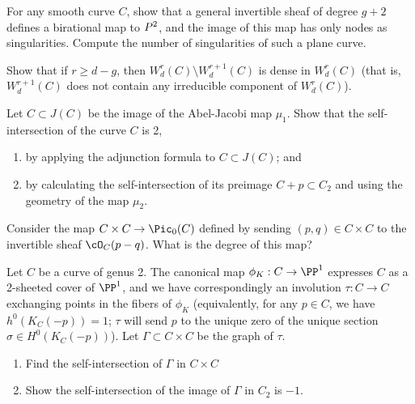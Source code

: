\begin{exercise}
For any smooth curve $C$, show that a general invertible sheaf of degree $g+2$ defines a birational map to $\\P^2$, and the image of this map has only nodes as singularities. Compute the number of singularities
of such a plane curve. %
\end{exercise}

\begin{exercise}
Show that if $r \geq d-g$, then $W^r_d(C) \setminus W^{r+1}_d(C)$ is dense in $W^r_d(C)$ (that is, $W^{r+1}_d(C)$ does not contain any irreducible component of $W^r_d(C)$).
\end{exercise}

\begin{exercise}
Let $C \subset J(C)$ be the image of the Abel-Jacobi map $\mu_1$. Show that the self-intersection of the curve $C$ is 2,
\begin{enumerate}
\item by applying the adjunction formula to $C \subset J(C)$; and
\item by calculating the self-intersection of its preimage $C + p \subset C_2$ and using the geometry of the map $\mu_2$.
\end{enumerate}
\end{exercise}

\begin{exercise}
Consider the map $C \times C \to \Pic_0(C)$ defined by sending $(p, q)\in C \times C$ to the invertible sheaf $\cO_C(p-q)$. What is the degree of this map?
\end{exercise}

\begin{exercise}\label{blow-up of $J(C)$ at a point}
Let $C$ be a curve of genus 2. The canonical map $\phi_K : C \to \PP^1$ expresses $C$ as a 2-sheeted cover of $\PP^1$, and we have correspondingly an involution $\tau : C \to C$ exchanging points in the fibers of $\phi_K$ (equivalently, for any $p \in C$, we have $h^0(K_C(-p)) = 1$; $\tau$ will send $p$ to the unique zero of the unique section $\sigma \in H^0(K_C(-p))$). Let $\Gamma \subset C \times C$ be the graph of $\tau$.
\begin{enumerate}
\item Find the self-intersection of $\Gamma$ in $C \times C$
\item Show the self-intersection of the image of $\Gamma$ in $C_2$ is $-1$.
\end{enumerate}
\end{exercise}



